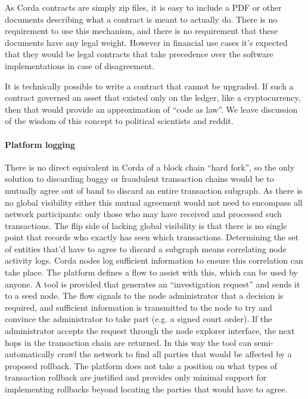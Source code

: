 \documentclass{article}
\begin{document}
As Corda contracts are simply zip files, it is easy to include a PDF or other documents describing what a contract
is meant to actually do. There is no requirement to use this mechanism, and there is no requirement that these
documents have any legal weight. However in financial use cases it's expected that they would be legal contracts that
take precedence over the software implementations in case of disagreement.

It is technically possible to write a contract that cannot be upgraded. If such a contract governed an asset that
existed only on the ledger, like a cryptocurrency, then that would provide an approximation of ``code as law''. We
leave discussion of the wisdom of this concept to political scientists and reddit.

\paragraph{Platform logging}There is no direct equivalent in Corda of a block chain ``hard fork'', so the only solution
to discarding buggy or fraudulent transaction chains would be to mutually agree out of band to discard an entire
transaction subgraph. As there is no global visibility either this mutual agreement would not need to encompass all
network participants: only those who may have received and processed such transactions. The flip side of lacking global
visibility is that there is no single point that records who exactly has seen which transactions. Determining the set
of entities that'd have to agree to discard a subgraph means correlating node activity logs. Corda nodes log sufficient
information to ensure this correlation can take place. The platform defines a flow to assist with this, which can be
used by anyone. A tool is provided that generates an ``investigation request'' and sends it to a seed node. The flow
signals to the node administrator that a decision is required, and sufficient information is transmitted to the node to
try and convince the administrator to take part (e.g. a signed court order). If the administrator accepts the request
through the node explorer interface, the next hops in the transaction chain are returned. In this way the tool can
semi-automatically crawl the network to find all parties that would be affected by a proposed rollback. The platform
does not take a position on what types of transaction rollback are justified and provides only minimal support for
implementing rollbacks beyond locating the parties that would have to agree.
\end{document}
